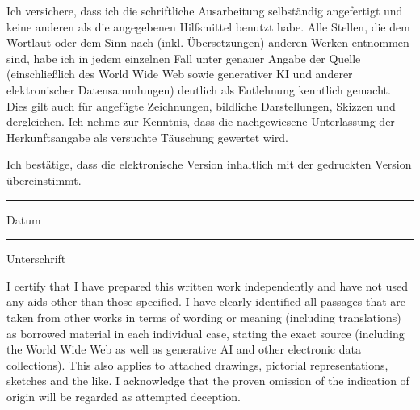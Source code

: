 \documentclass[12pt,a4paper]{article}
\newcommand{\titlepagefont}{\ebgaramond}
\begin{document}
\begin{titlepage}
    \thispagestyle{empty}
    \titlepagefont
    \vspace*{\fill}


    \vspace{0.8cm}

    \noindent
    Ich versichere, dass ich die schriftliche Ausarbeitung selbst\"andig angefertigt und keine anderen als die angegebenen Hilfsmittel benutzt habe. Alle Stellen, die dem Wortlaut oder dem Sinn nach (inkl. \"Ubersetzungen) anderen Werken entnommen sind, habe ich in jedem einzelnen Fall unter genauer Angabe der Quelle (einschlie\ss lich des World Wide Web sowie generativer KI und anderer elektronischer Datensammlungen) deutlich als Entlehnung kenntlich gemacht. Dies gilt auch f\"ur angef\"ugte Zeichnungen, bildliche Darstellungen, Skizzen und dergleichen. Ich nehme zur Kenntnis, dass die nachgewiesene Unterlassung der Herkunftsangabe als versuchte T\"auschung gewertet wird.

    \vspace{0.8cm}

    \noindent
    Ich best\"atige, dass die elektronische Version inhaltlich mit der gedruckten Version \"ubereinstimmt.

    \vspace{1.8cm}

    \noindent
    \begin{minipage}[t]{0.45\textwidth}
        \raggedright
        \rule{0.9\linewidth}{0.4pt}\par
        Datum
    \end{minipage}%
    \hfill
    \begin{minipage}[t]{0.45\textwidth}
        \raggedright
        \rule{0.9\linewidth}{0.4pt}\par
        Unterschrift
    \end{minipage}

    \vspace{1.6cm}


    \vspace{0.8cm}

    \noindent
    I certify that I have prepared this written work independently and have not used any aids other than those specified. I have clearly identified all passages that are taken from other works in terms of wording or meaning (including translations) as borrowed material in each individual case, stating the exact source (including the World Wide Web as well as generative AI and other electronic data collections). This also applies to attached drawings, pictorial representations, sketches and the like. I acknowledge that the proven omission of the indication of origin will be regarded as attempted deception.


\end{titlepage}
\end{document}
